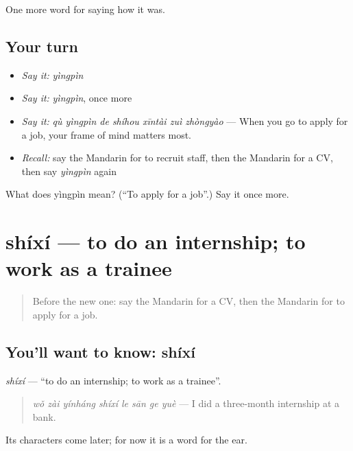 \begin{grammarlens}[title={What you've built}]
One more word for saying how it was.
\end{grammarlens}

\subsection*{Your turn}
\begin{itemize}
\raggedright
  \item \emph{Say it:} \emph{yìngpìn}
  \item \emph{Say it:} \emph{yìngpìn}, once more
  \item \emph{Say it:} \emph{qù yìngpìn de shíhou xīntài zuì zhòngyào} — When you go to apply for a job, your frame of mind matters most.
  \item \emph{Recall:} say the Mandarin for to recruit staff, then the Mandarin for a CV, then say \emph{yìngpìn} again
\end{itemize}

\begin{tcolorbox}[breakable,colback=teal!4,colframe=teal!35!black,title={Before you move on}]
What does yìngpìn mean? (\textquotedblleft{}To apply for a job\textquotedblright{}.) Say it once more.
\end{tcolorbox}
\section[shíxí]{shíxí — to do an internship; to work as a trainee}

\label{lesson:ZH-C486-shixi}



\begin{quote}
Before the new one: say the Mandarin for a CV, then the Mandarin for to apply for a job.
\end{quote}

\subsection*{You'll want to know: shíxí}
\emph{shíxí} — \textquotedblleft{}to do an internship; to work as a trainee\textquotedblright{}.

\begin{quote}
\emph{wǒ zài yínháng shíxí le sān ge yuè} — I did a three-month internship at a bank.
\end{quote}

Its characters come later; for now it is a word for the ear.

